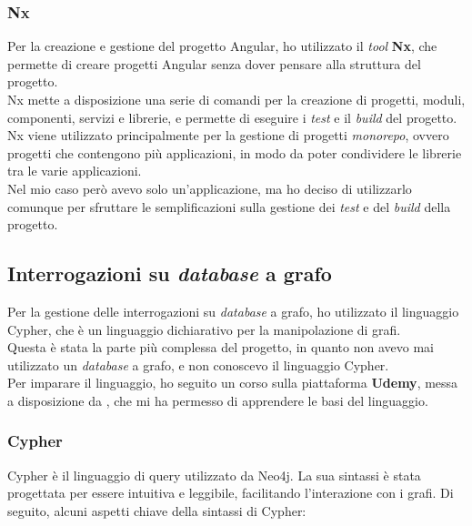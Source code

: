 \subsubsection*{Nx}
Per la creazione e gestione del progetto Angular, ho utilizzato il \textit{tool} \textbf{Nx}, 
che permette di creare progetti Angular senza dover pensare alla struttura del progetto.\\
Nx mette a disposizione una serie di comandi per la creazione di progetti, moduli, componenti, servizi e librerie,
e permette di eseguire i \textit{test} e il \textit{build} del progetto.\\
Nx viene utilizzato principalmente per la gestione di progetti \textit{monorepo}, ovvero progetti che contengono più applicazioni,
in modo da poter condividere le librerie tra le varie applicazioni.\\
Nel mio caso però avevo solo un'applicazione, ma ho deciso di utilizzarlo comunque per sfruttare le semplificazioni sulla gestione 
dei \textit{test} e del \textit{build} della progetto.\\

\subsection*{Interrogazioni su \textit{database} a grafo}
Per la gestione delle interrogazioni su \textit{database} a grafo, ho utilizzato il linguaggio Cypher,
che è un linguaggio dichiarativo per la manipolazione di grafi.\\
Questa è stata la parte più complessa del progetto, in quanto non avevo mai utilizzato un \textit{database} a grafo,
e non conoscevo il linguaggio Cypher.\\
Per imparare il linguaggio, ho seguito un corso sulla piattaforma \textbf{Udemy}, messa a disposizione da \azienda{},
che mi ha permesso di apprendere le basi del linguaggio.\\

\subsubsection*{Cypher}
Cypher è il linguaggio di query utilizzato da Neo4j. La sua sintassi è stata progettata per essere intuitiva e leggibile, 
facilitando l'interazione con i grafi. Di seguito, alcuni aspetti chiave della sintassi di Cypher:

